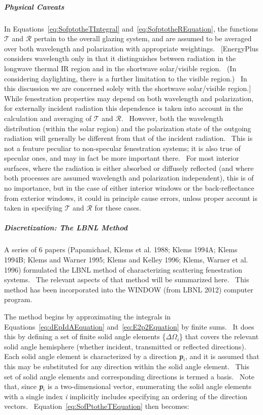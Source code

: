 \subparagraph{Physical Caveats}\label{physical-caveats}

In Equations~\ref{eq:SofptotheTIntegral} and~\ref{eq:SofptotheREquation}, the functions $\mathcal{T}$ and $\mathcal{R}$ pertain to the overall glazing system, and are assumed to be averaged over both wavelength and polarization with appropriate weightings.~ {[}EnergyPlus considers wavelength only in that it distinguishes between radiation in the longwave thermal IR region and in the shortwave solar/visible region.~ (In considering daylighting, there is a further limitation to the visible region.)~ In this discussion we are concerned solely with the shortwave solar/visible region.{]}~ While fenestration properties may depend on both wavelength and polarization, for externally incident radiation this dependence is taken into account in the calculation and averaging of $\mathcal{T}$ and $\mathcal{R}$.~ However, both the wavelength distribution (within the solar region) and the polarization state of the outgoing radiation will generally be different from that of the incident radiation.~ This is not a feature peculiar to non-specular fenestration systems; it is also true of specular ones, and may in fact be more important there.~ For most interior surfaces, where the radiation is either absorbed or diffusely reflected (and where both processes are assumed wavelength and polarization independent), this is of no importance, but in the case of either interior windows or the back-reflectance from exterior windows, it could in principle cause errors, unless proper account is taken in specifying $\mathcal{T}$ and $\mathcal{R}$ for these cases.

\subparagraph{Discretization: The LBNL Method}\label{discretization-the-lbnl-method}

A series of 6 papers (Papamichael, Klems et al. 1988; Klems 1994A; Klems 1994B; Klems and Warner 1995; Klems and Kelley 1996; Klems, Warner et al. 1996) formulated the LBNL method of characterizing scattering fenestration systems.~ The relevant aspects of that method will be summarized here.~ This method has been incorporated into the WINDOW (from LBNL 2012) computer program.

The method begins by approximating the integrals in Equations~\ref{eq:dEpIdAEquation} and~\ref{eq:E2p2Equation} by finite sums.~ It does this by defining a set of finite solid angle elements \{\(\Delta {\Omega_i}\)\} that covers the relevant solid angle hemisphere (whether incident, transmitted or reflected directions).~ Each solid angle element is characterized by a direction \textbf{\emph{p}}\emph{\(_{i}\)}, and it is assumed that this may be substituted for any direction within the solid angle element.~ This set of solid angle elements and corresponding directions is termed a basis.~ Note that, since \textbf{\emph{p}}\emph{\(_{i}\)} is a two-dimensional vector, enumerating the solid angle elements with a single index \emph{i} implicitly includes specifying an ordering of the direction vectors.~ Equation~\ref{eq:SofPtotheTEquation} then becomes:

